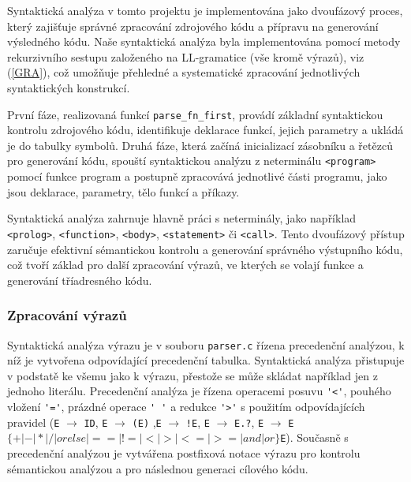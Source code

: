 \documentclass[a4paper, 11pt]{article}
\begin{document}
Syntaktická analýza v tomto projektu je implementována jako dvoufázový proces, který zajišťuje správné zpracování zdrojového kódu a přípravu na generování výsledného kódu. 
Naše syntaktická analýza byla implementována pomocí metody rekurzivního sestupu založeného na LL\--gramatice (vše kromě výrazů), viz (\ref{GRA}), což umožňuje přehledné a systematické zpracování jednotlivých syntaktických konstrukcí.

První fáze, realizovaná funkcí \verb|parse_fn_first|, provádí základní syntaktickou kontrolu zdrojového kódu, identifikuje deklarace funkcí, jejich parametry a ukládá je do tabulky symbolů. 
Druhá fáze, která začíná inicializací zásobníku a řetězců pro generování kódu, spouští syntaktickou analýzu z neterminálu \verb|<program>| pomocí funkce program a postupně zpracovává jednotlivé části programu, jako jsou deklarace, parametry, tělo funkcí a příkazy.

Syntaktická analýza zahrnuje hlavně práci s neterminály, jako například \verb|<prolog>|, \verb|<function>|, \verb|<body>|, \verb|<statement>| či \verb|<call>|.
Tento dvoufázový přístup zaručuje efektivní sémantickou kontrolu a generování správného výstupního kódu, což tvoří základ pro další zpracování výrazů, ve kterých se volají funkce a generování tříadresného kódu.
\subsubsection{Zpracování výrazů}

Syntaktická analýza výrazu je v souboru \verb|parser.c| řízena precedenční analýzou, k níž je vytvořena odpovídající precedenční tabulka. 
Syntaktická analýza přistupuje v podstatě ke všemu jako k výrazu, přestože se může skládat například jen z jednoho literálu.  
Precedenční analýza je řízena operacemi posuvu \verb|'<'|, pouhého vložení \verb|'='|, prázdné operace \verb|' '| a redukce \verb|'>'| s použitím odpovídajících pravidel (\verb|E| $\rightarrow$ \verb|ID|, \verb|E| $\rightarrow$ \verb|(E)| ,\verb|E| $\rightarrow$ \verb|!E|, \verb|E| $\rightarrow$ \verb|E.?|, \verb|E| $\rightarrow$ \verb|E|$\{+|-|*|/|orelse|==|!=|<|>|<=|>=|and|or\}$\verb|E|).
Současně s precedenční analýzou je vytvářena postfixová notace výrazu pro kontrolu sémantickou analýzou a pro následnou generaci cílového kódu.

\end{document}
